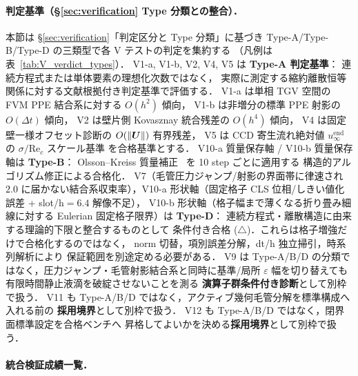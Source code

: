 \paragraph{判定基準（§\ref{sec:verification} Type 分類との整合）．}
本節は §\ref{sec:verification}「判定区分と Type 分類」に基づき
Type-A/Type-B/Type-D の三類型で各 V テストの判定を集約する
（凡例は表~\ref{tab:V_verdict_types}）．
V1-a, V1-b, V2, V4, V5 は \textbf{Type-A 判定基準}：
連続方程式または単体要素の理想化次数ではなく，
実際に測定する縮約離散恒等関係に対する文献根拠付き判定基準で評価する．
V1-a は単相 TGV 空間の FVM PPE 結合系に対する $O(h^2)$ 傾向，
V1-b は非増分の標準 PPE 射影の $O(\Delta t)$ 傾向，
V2 は壁片側 Kovasznay 統合残差の $O(h^4)$ 傾向，
V4 は固定壁一様オフセット診断の $O(\|\bm{U}\|)$ 有界残差，
V5 は CCD 寄生流れ絶対値 $u_\infty^{\mathrm{end}}$ の $\sigma/\mathrm{Re}_c$ スケール基準
を合格基準とする．
V10-a 質量保存軸 / V10-b 質量保存軸は \textbf{Type-B}：
Olsson--Kreiss 質量補正~\cite{OlssonKreiss2005} を 10 step ごとに適用する
構造的アルゴリズム修正による合格化．
V7（毛管圧力ジャンプ/射影の界面帯に律速され $2.0$ に届かない結合系収束率），V10-a 形状軸（固定格子 CLS 位相/しきい値化誤差 + slot/h$=6.4$ 解像不足），
V10-b 形状軸（格子幅まで薄くなる折り畳み細線に対する Eulerian 固定格子限界）は \textbf{Type-D}：
連続方程式・離散構造に由来する理論的下限と整合するものとして
条件付き合格 ($\triangle$)．これらは格子増強だけで合格化するのではなく，
norm 切替，項別誤差分解，dt/h 独立掃引，時系列解析により
保証範囲を別途定める必要がある．
V9 は Type-A/B/D の分類ではなく，圧力ジャンプ・毛管射影結合系と同時に基準/局所
$\varepsilon$ 幅を切り替えても有限時間静止液滴を破綻させないことを測る
\textbf{演算子群条件付き診断}として別枠で扱う．
V11 も Type-A/B/D ではなく，アクティブ幾何毛管分解を標準構成へ入れる前の
\textbf{採用境界}として別枠で扱う．
V12 も Type-A/B/D ではなく，閉界面標準設定を合格ベンチへ
昇格してよいかを決める\textbf{採用境界}として別枠で扱う．

\paragraph{統合検証成績一覧．}

